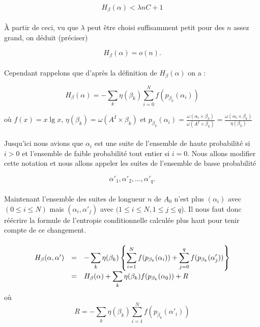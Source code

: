 	\[H_\beta(\alpha) < \lambda nC + 1\]
	
	\paragraph{}
	À partir de ceci, vu que $\lambda$ peut être choisi suffisamment petit pour
	 des $n$ assez grand, on déduit (préciser)
	
	\[H_\beta(\alpha)=o(n).\]
	
	\paragraph{}
	Cependant rappelons que d'après la définition de $H_\beta(\alpha)$ on a :
	
	\[
		H_\beta(\alpha) = 
		- \sum_k\eta(\beta_k)\sum_{i=0}^Nf(p_{\beta_k}(\alpha_i))
	\]
	
	où $f(x) = x \lg x$, $\eta(\beta_k) = \omega(A^I \times \beta_k)$ 
	et 
		$p_{\beta_k}(\alpha_i) = 
		\frac{\omega(\alpha_i \times \beta_k)}{\omega(A^I \times \beta_k)}=
		\frac{\omega(\alpha_i \times \beta_k)}{\eta(\beta_k)}$	
	
	\paragraph{}
	Jusqu'ici nous avions que $\alpha_i$ est une suite de l'ensemble de haute 
	probabilité si $i>0$ et l'ensemble de faible probabilité tout entier si 
	$i=0$. Nous allons modifier cette notation et nous allons appeler les 
	suites de l'ensemble de basse probabilité 
	
	\[\alpha'_1, \alpha'_2, \dots, \alpha'_q.\]
	
	\paragraph{}
	Maintenant l'ensemble des suites de longueur $n$ de $A_0$ n'est plus 
	$(\alpha_i)$ avec $(0 \le i \le N)$ mais $(\alpha_i, \alpha'_j)$ avec 
	$(1\le i \le N, 1 \le j \le q$). Il nous faut donc réécrire la formule de
	 l'entropie conditionnelle calculée plus haut pour tenir compte de ce
	 changement.
	
	\paragraph{}
	\[
		\begin{array}{r c >{\displaystyle}l}
			H_\beta(\alpha,\alpha') &=& 
				- \sum_k\eta(\beta_k)\left\{
					\sum_{i=1}^Nf(p_{\beta_k}(\alpha_i))+
					\sum_{j=0}^qf(p_{\beta_k}(\alpha'_j))
				\right\}\\
			&=& H_\beta(\alpha) + 
				\sum_k\eta(\beta_k)f(p_{\beta_k}(\alpha_0))+R
		\end{array}
	\]
	où
	\[R=- \sum_k\eta(\beta_k)\sum_{i=1}^Nf(p_{\beta_k}(\alpha'_i))\]
	
